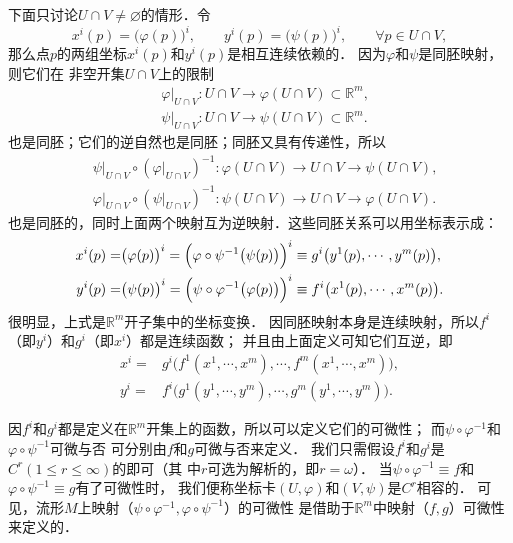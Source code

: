 下面只讨论$U \cap V \neq \varnothing$的情形．令
\begin{equation}
    x^i(p)=\bigl(\varphi(p)\bigr)^i, \qquad
    y^i(p)=\bigl(\psi(p)\bigr)^i, \qquad 
    \forall p \in U \cap V ,
\end{equation}
那么点$p$的两组坐标$x^i(p)$和$y^i(p)$是相互连续依赖的．
因为$\varphi$和$\psi$是同胚映射，则它们在
非空开集$U \cap V$上的限制
\begin{align*}
    &\left. \varphi \right | _{U \cap V} :{U \cap V} \to \varphi ({U \cap V}) \subset \mathbb{R}^m , \\ 
    &\left. \psi \right | _{U \cap V} :{U \cap V} \to \psi ({U \cap V}) \subset \mathbb{R}^m .
\end{align*}
也是同胚；它们的逆自然也是同胚；同胚又具有传递性，所以
\begin{align*}
    &\left. \psi \right | _{U \cap V} \circ (\left. \varphi \right | _{U \cap V} )^{-1}
       :\varphi({U \cap V}) \to {U \cap V} \to \psi ({U \cap V}) , \\ 
    &\left. \varphi \right | _{U \cap V} \circ (\left. \psi \right | _{U \cap V} )^{-1}
       :\psi({U \cap V}) \to {U \cap V} \to \varphi({U \cap V}) .
\end{align*}
也是同胚的，同时上面两个映射互为逆映射．这些同胚关系可以用坐标表示成：
\begin{align}
    x^i(p)=&\bigl(\varphi(p)\bigr)^i = \Bigl(\varphi \circ \psi^{-1} \bigl(\psi(p)\bigr)\Bigr)^i
      \equiv g^i\bigl( y^1(p),\cdots, y^m(p) \bigr) ,  \\
    y^i(p)=&\bigl(\psi(p)\bigr)^i = \Bigl( \psi \circ \varphi^{-1}\bigl(\varphi(p)\bigr)\Bigr)^i 
      \equiv f^i\bigl( x^1(p),\cdots, x^m(p)\bigr) .
\end{align}
很明显，上式是$\mathbb{R}^m$开子集中的坐标变换．
因同胚映射本身是连续映射，所以$f^i$（即$y^i$）和$g^i$（即$x^i$）都是连续函数；
并且由上面定义可知它们互逆，即
\begin{align}
    x^i=& g^i\bigl( f^1(x^1,\cdots,x^m),\cdots, f^m(x^1,\cdots,x^m) \bigr) ,  \\
    y^i=& f^i\bigl( g^1(y^1,\cdots,y^m),\cdots, g^m(y^1,\cdots,y^m)\bigr) .
\end{align}

因$f^i$和$g^i$都是定义在$\mathbb{R}^m$开集上的函数，所以可以定义它们的可微性；
而$\psi \circ \varphi^{-1}$和$\varphi \circ \psi^{-1} $可微与否
可分别由$f$和$g$可微与否来定义．
我们只需假设$f^i$和$g^i$是$C^r(1\leqslant r \leqslant \infty)$的即可（其
中$r$可选为解析的，即$r=\omega$）．
当$\psi \circ \varphi^{-1}\equiv f$和$\varphi \circ \psi^{-1}\equiv g $有了可微性时，
我们便称坐标卡$(U,\varphi)$和$(V,\psi)$是$C^r${\kaishu 相容的}．
可见，流形$M$上映射（$\psi\circ\varphi^{-1},\varphi\circ\psi^{-1}$）的可微性
是借助于$\mathbb{R}^m$中映射（$f,g$）可微性来定义的．

